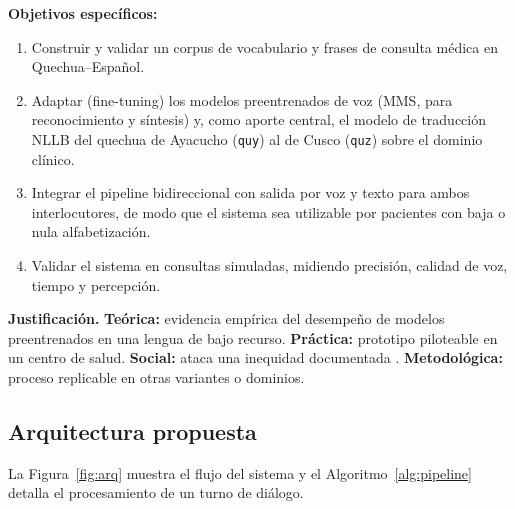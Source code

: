\documentclass[12pt,a4paper]{article}
\begin{document}
\textbf{Objetivos espec{\'i}ficos:}
\begin{enumerate}
  \item Construir y validar un corpus de vocabulario y frases de consulta m{\'e}dica en Quechua--Espa{\~n}ol.
  \item Adaptar (fine-tuning) los modelos preentrenados de voz (MMS, para reconocimiento y s{\'i}ntesis) y, como aporte central, el modelo de traducci{\'o}n NLLB del quechua de Ayacucho (\texttt{quy}) al de Cusco (\texttt{quz}) sobre el dominio cl{\'i}nico.
  \item Integrar el pipeline bidireccional con salida por voz y texto para ambos interlocutores, de modo que el sistema sea utilizable por pacientes con baja o nula alfabetizaci{\'o}n.
  \item Validar el sistema en consultas simuladas, midiendo precisi{\'o}n, calidad de voz, tiempo y percepci{\'o}n.
\end{enumerate}

\textbf{Justificaci{\'o}n.} \textbf{Te{\'o}rica:} evidencia emp{\'i}rica del desempe{\~n}o de modelos
preentrenados en una lengua de bajo recurso. \textbf{Pr{\'a}ctica:} prototipo piloteable en un
centro de salud. \textbf{Social:} ataca una inequidad documentada \parencite{begazo2026}.
\textbf{Metodol{\'o}gica:} proceso replicable en otras variantes o dominios.

\subsection{Arquitectura propuesta}
La Figura~\ref{fig:arq} muestra el flujo del sistema y el Algoritmo~\ref{alg:pipeline} detalla el
procesamiento de un turno de di{\'a}logo.
\end{document}
